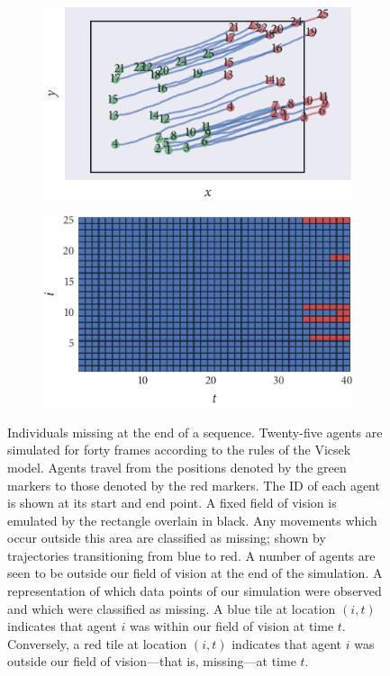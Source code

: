 \begin{figure}[tbp]
  \begin{subfigure}[b]{0.5\textwidth}
    \includegraphics{end/data.pdf}
    \caption{}
    \label{subfig:end_data}
  \end{subfigure}%
  \begin{subfigure}[b]{0.5\textwidth}
    \includegraphics{end/missing_array.pdf}
    \caption{}
    \label{subfig:end_missing}
  \end{subfigure}
  \caption{Individuals missing at the end of a sequence.
   Twenty-five agents are simulated for forty frames
  according to the rules of the Vicsek model. Agents travel from the positions
  denoted by the green markers to those denoted by the red markers. The ID of
  each agent is shown at its start and end point. A fixed field of vision is
  emulated by the rectangle overlain in black. Any movements which occur
  outside this area are classified as missing; shown by trajectories
  transitioning from blue to red. A number of agents are seen to be outside our
  field of vision at the end of the simulation.
   A representation of which data points of our
  simulation were observed and which were classified as missing. A blue tile at
  location $(i, t)$ indicates that agent $i$ was within our field of vision at
  time $t$. Conversely, a red tile at location $(i, t)$ indicates that agent
  $i$ was outside our field of vision---that is, missing---at time $t$.}
  \label{fig:end_data}
\end{figure}

